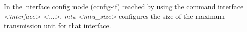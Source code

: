 In the interface config mode (config-if) reached by using the command interface \emph{<interface> <...>}, \emph{mtu <mtu\_size>} configures the size of the maximum transmission unit for that interface.